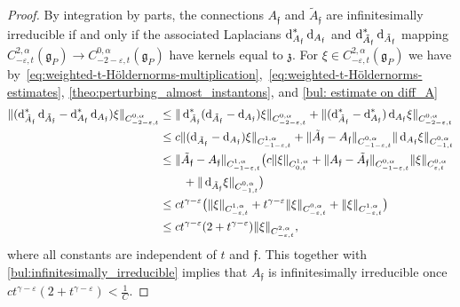 \documentclass[11pt,a4paper]{scrartcl}
\newcommand*\diff{\mathop{}\!\textup{d}}
\newcommand{\VertWHt}[3]{\Vert_{C^{{#1},\alpha}_{{#2},t}{#3}}}
\numberwithin{equation}{section}
\theoremstyle{plain}
\theoremstyle{definition}
\theoremstyle{remark}
\begin{document}
\begin{proof}
By integration by parts, the connections $A_{\mathfrak{f}}$ and $\tilde{A}_{\mathfrak{f}}$ are infinitesimally irreducible if and only if the associated Laplacians $\diff_{A_{\mathfrak{f}}}^*\diff_{A_{\mathfrak{f}}}$ and $\diff_{\tilde{A}_{\mathfrak{f}}}^*\diff_{\tilde{A}_{\mathfrak{f}}}$ mapping $ C^{2,\alpha}_{-\varepsilon,t}(\mathfrak{g}_P) \to C^{0,\alpha}_{-2-\varepsilon,t}(\mathfrak{g}_P)$ have kernels equal to $\mathfrak{z}$. For $\xi \in C^{2,\alpha}_{-\varepsilon,t}(\mathfrak{g}_P)$ we have by~\eqref{eq:weighted-t-Höldernorms-multiplication},~\eqref{eq:weighted-t-Höldernorms-estimates}, \autoref{theo:perturbing_almost_instantons}, and \autoref{bul: estimate on diff_A}
\begin{align*}
\Vert (\diff_{\tilde{A}_{\mathfrak{f}}}^*\diff_{\tilde{A}_{\mathfrak{f}}} - \diff_{A_{\mathfrak{f}}}^*\diff_{A_{\mathfrak{f}}}) \xi \VertWHt{0}{-2-\varepsilon}{} & \leq \Vert \diff_{\tilde{A}_{\mathfrak{f}}}^*(\diff_{\tilde{A}_{\mathfrak{f}}} - \diff_{A_{\mathfrak{f}}}) \xi \VertWHt{0}{-2-\varepsilon}{} + \Vert (\diff_{\tilde{A}_{\mathfrak{f}}}^* - \diff_{A_{\mathfrak{f}}}^*)\diff_{A_{\mathfrak{f}}} \xi \VertWHt{0}{-2-\varepsilon}{} \\
& \leq c \Vert (\diff_{\tilde{A}_{\mathfrak{f}}} - \diff_{A_{\mathfrak{f}}}) \xi \VertWHt{1}{-1-\varepsilon}{} + \Vert \tilde{A}_{\mathfrak{f}}-A_{\mathfrak{f}} \VertWHt{0}{-1-\varepsilon}{} \Vert \diff_{A_{\mathfrak{f}}} \xi \VertWHt{0}{-1}{} \\
& \leq \Vert \tilde{A}_{\mathfrak{f}}-A_{\mathfrak{f}} \VertWHt{1}{-1-\varepsilon}{} \big(c \Vert \xi \VertWHt{1}{0}{}+ \Vert A_{\mathfrak{f}} - \tilde{A}_{\mathfrak{f}} \VertWHt{0}{-1-\varepsilon}{} \Vert  \xi \VertWHt{0}{\varepsilon}{} \\
&\qquad  +\Vert \diff_{\tilde{A}_{\mathfrak{f}}} \xi \VertWHt{0}{-1}{} \big)\\
&\leq c t^{\gamma-\varepsilon} \big(\Vert \xi \VertWHt{1}{-\varepsilon}{}+  t^{\gamma-\varepsilon} \Vert \xi \VertWHt{0}{-\varepsilon}{} + \Vert \xi \VertWHt{1}{-\varepsilon}{} \big) \\
& \leq c t^{\gamma-\varepsilon} (2+t^{\gamma-\varepsilon}) \Vert \xi \VertWHt{2}{-\varepsilon}{},
\end{align*}
where all constants are independent of $t$ and $\mathfrak{f}$. This together with \autoref{bul:infinitesimally_irreducible} implies that $A_{\mathfrak{f}}$ is infinitesimally irreducible once $c t^{\gamma-\varepsilon} (2+ t^{\gamma-\varepsilon})<\frac{1}{C}$. 
\end{proof}
\end{document}
